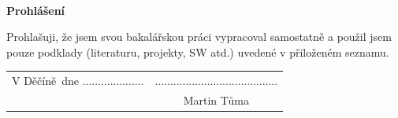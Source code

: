\documentclass[a4paper,oneside,12pt]{book}
\newcommand{\tb}{\textbf} %
\newcommand{\woman}{} %
\newcommand{\autor}{Martin Tůma}   %
\newcommand{\kde}{Děčíně} %
\newcommand{\prohlaseni}{Prohlašuji, že jsem svou bakalářskou práci vypracoval\woman{} samostatně a použil\woman{} jsem pouze podklady (literaturu, projekty, SW atd.) uvedené v přiloženém seznamu.} %
\newcommand{\podekovani}{Děkuji ... za ...} %
\begin{document}





\newpage %
\thispagestyle{empty}  %

~ %
\vfill %

\tb{Prohlášení} %

\vspace{1em} %
\prohlaseni

\vspace{2em}  %
\hspace{-0.5em}\begin{tabularx}{\textwidth}{X c}  %
V \kde\ dne .................... &........................................ \\	%
	& \autor
\end{tabularx}	%







\newpage   %
\thispagestyle{empty}   %
\end{document}
